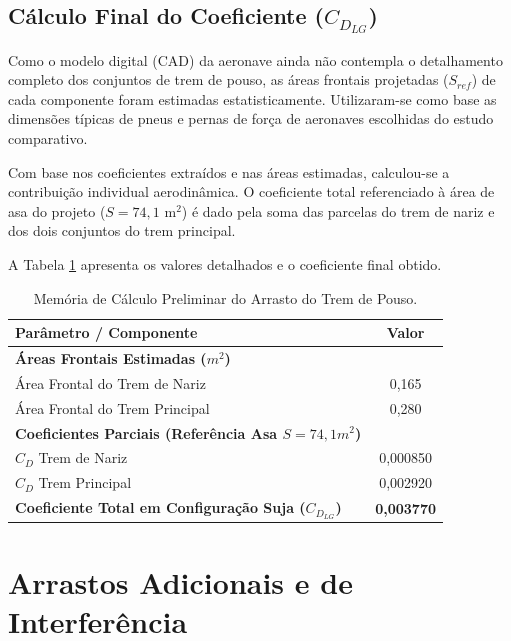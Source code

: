 \subsection{Cálculo Final do Coeficiente ($C_{D_{LG}}$)}
Como o modelo digital (CAD) da aeronave ainda não contempla o detalhamento completo dos conjuntos de trem de pouso, as áreas frontais projetadas ($S_{ref}$) de cada componente foram estimadas estatisticamente. Utilizaram-se como base as dimensões típicas de pneus e pernas de força de aeronaves escolhidas do estudo comparativo.

Com base nos coeficientes extraídos e nas áreas estimadas, calculou-se a contribuição individual aerodinâmica. O coeficiente total referenciado à área de asa do projeto ($S = 74,1 \text{ m}^2$) é dado pela soma das parcelas do trem de nariz e dos dois conjuntos do trem principal. 

A Tabela \ref{tab:trem_pouso} apresenta os valores detalhados e o coeficiente final obtido.

\begin{table}[H]
    \centering
    \caption{Memória de Cálculo Preliminar do Arrasto do Trem de Pouso.}
    \vspace{0.2cm}
    \begin{tabular}{lc}
        \toprule
        \textbf{Parâmetro / Componente} & \textbf{Valor} \\
        \midrule
        \textbf{Áreas Frontais Estimadas ($m^2$)} & \\
        Área Frontal do Trem de Nariz & 0,165 \\ 
        Área Frontal do Trem Principal & 0,280 \\ 
        \midrule
        \textbf{Coeficientes Parciais (Referência Asa $S = 74,1 m^2$)} & \\
        $C_D$ Trem de Nariz & 0,000850 \\ 
        $C_D$ Trem Principal & 0,002920 \\ 
        \midrule
        \textbf{Coeficiente Total em Configuração Suja ($C_{D_{LG}}$)} & \textbf{0,003770} \\ 
        \bottomrule
    \end{tabular}
    \label{tab:trem_pouso}
\end{table}

\section{Arrastos Adicionais e de Interferência}

